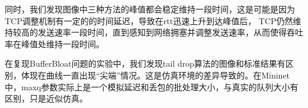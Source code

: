 \documentclass[11pt]{article}
\begin{document}
同时，我们发现图像中三种方法的峰值都会稳定维持一段时间，这是可能是因为TCP调整机制有一定的的时间延迟，导致在rtt迅速上升到达峰值后，
TCP仍然维持较高的发送速率一段时间，直到感知到网络拥塞并调整发送速率，从而使得吞吐率在峰值处维持一段时间。

在复现BufferBloat问题的实验中，我们发现tail drop算法的图像和标准结果有区别，体现在曲线一直出现“尖端”情况。这是仿真环境的差异导致的。在Mininet中，maxq参数实际上是一个模拟延迟和丢包的批处理大小，与真实的队列大小有区别，只是近似仿真。
\end{document}
